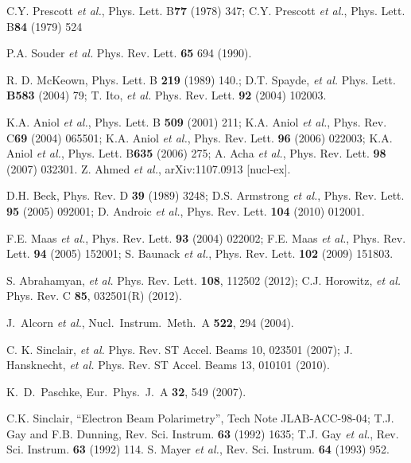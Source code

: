 \begin{thebibliography}{99} 


 C.Y. Prescott {\it et al.}, Phys. Lett. B{\bf 77} (1978) 347; C.Y. Prescott {\it et al.}, Phys. Lett. B{\bf 84} (1979) 524

 P.A. Souder {\it et al.} Phys. Rev. Lett. {\bf 65} 694 (1990).

 R. D. McKeown, Phys. Lett. B {\bf 219} (1989) 140.; 
D.T. Spayde, {\it et al.} Phys. Lett. {\bf B583} (2004) 79; 
T. Ito, {\it et al.} Phys. Rev. Lett. {\bf 92} (2004) 102003.

 K.A. Aniol {\it et al.}, Phys. Lett. B {\bf 509} (2001) 211;
K.A. Aniol {\it et al.}, Phys. Rev. C{\bf 69} (2004) 065501;
K.A. Aniol {\it et al.}, Phys. Rev. Lett. {\bf 96} (2006) 022003; 
K.A. Aniol {\it et al.}, Phys. Lett. B{\bf 635} (2006) 275;
A. Acha {\it et al.}, Phys. Rev. Lett. {\bf 98} (2007) 032301.
Z. Ahmed {\it et al.}, arXiv:1107.0913 [nucl-ex].

D.H. Beck, Phys. Rev. D {\bf 39} (1989) 3248;
D.S. Armstrong {\it et al.}, Phys. Rev. Lett. {\bf 95} (2005) 092001;
D. Androic {\it et al.}, Phys. Rev. Lett. {\bf 104} (2010) 012001.

F.E. Maas {\it et al.}, Phys. Rev. Lett. {\bf 93} (2004) 022002;
F.E. Maas {\it et al.}, Phys. Rev. Lett. {\bf 94} (2005) 152001;
S. Baunack {\it et al.}, Phys. Rev. Lett. {\bf 102} (2009) 151803.

S. Abrahamyan, {\it et al.} Phys. Rev. Lett. {\bf 108}, 112502 (2012);
C.J. Horowitz, {\it et al.} Phys. Rev. C {\bf 85}, 032501(R) (2012).

  J.~Alcorn  %
 {\it et al.},  %
  Nucl.\ Instrum.\ Meth.\ A {\bf 522}, 294 (2004).
%

C. K. Sinclair, {\it et al.} Phys. Rev. ST Accel. Beams 10, 023501 (2007);
J. Hansknecht, {\it et al.} Phys. Rev. ST Accel. Beams 13, 010101 (2010).

  K.~D.~Paschke,
  Eur.\ Phys.\ J.\  A {\bf 32}, 549 (2007).

 C.K. Sinclair, ``Electron
Beam Polarimetry'', Tech Note JLAB-ACC-98-04;
T.J. Gay and F.B. Dunning, Rev. Sci. Instrum.
{\bf 63} (1992) 1635; T.J. Gay {\em et al.},
Rev. Sci. Instrum. {\bf 63} (1992) 114.  
S. Mayer {\em et al.}, Rev. Sci. Instrum.
{\bf 64} (1993) 952. 



\end{thebibliography}
